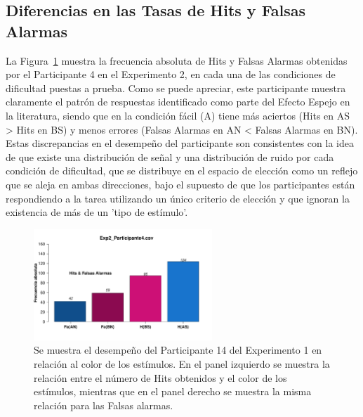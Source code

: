 \subsection{Diferencias en las Tasas de Hits y Falsas Alarmas}




La Figura~\ref{fig:MirrorRate_E2_P4} muestra la frecuencia absoluta de Hits y Falsas Alarmas obtenidas por el Participante 4 en el Experimento 2, en cada una de las condiciones de dificultad puestas a prueba. Como se puede apreciar, este participante muestra claramente el patrón de respuestas identificado como parte del Efecto Espejo en la literatura, siendo que en la condición fácil (A) tiene más aciertos (Hits en AS > Hits en BS) y menos errores (Falsas Alarmas en AN < Falsas Alarmas en BN). Estas discrepancias en el desempeño del participante son consistentes con la idea de que existe una distribución de señal y una distribución de ruido por cada condición de dificultad, que se distribuye en el espacio de elección como un reflejo que se aleja en ambas direcciones, bajo el supuesto de que los participantes están respondiendo a la tarea utilizando un único criterio de elección y que ignoran la existencia de más de un 'tipo de estímulo'.\\

\begin{figure}[th]
\centering
\includegraphics[width=0.60\textwidth]{Figures/MirrorRate_Exp2_P4}
\caption[Diferencias entre Hits y Falsas Alarmas por Condición; Ejemplo]{Se muestra el desempeño del Participante 14 del Experimento 1 en relación al color de los estímulos. En el panel izquierdo se muestra la relación entre el número de Hits obtenidos y el color de los estímulos, mientras que en el panel derecho se muestra la misma relación para las Falsas alarmas.}
\label{fig:MirrorRate_E2_P4}
\end{figure}




